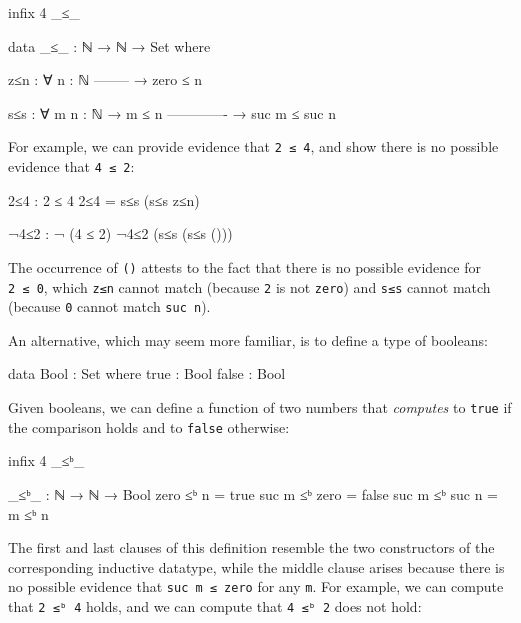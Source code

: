 \begin{fence}
\begin{code}
infix 4 _≤_

data _≤_ : ℕ → ℕ → Set where

  z≤n : ∀ {n : ℕ}
      --------
    → zero ≤ n

  s≤s : ∀ {m n : ℕ}
    → m ≤ n
      -------------
    → suc m ≤ suc n
\end{code}
\end{fence}

For example, we can provide evidence that \texttt{2\ ≤\ 4}, and show
there is no possible evidence that \texttt{4\ ≤\ 2}:

\begin{fence}
\begin{code}
2≤4 : 2 ≤ 4
2≤4 = s≤s (s≤s z≤n)

¬4≤2 : ¬ (4 ≤ 2)
¬4≤2 (s≤s (s≤s ()))
\end{code}
\end{fence}

The occurrence of \texttt{()} attests to the fact that there is no
possible evidence for \texttt{2\ ≤\ 0}, which \texttt{z≤n} cannot match
(because \texttt{2} is not \texttt{zero}) and \texttt{s≤s} cannot match
(because \texttt{0} cannot match \texttt{suc\ n}).

An alternative, which may seem more familiar, is to define a type of
booleans:

\begin{fence}
\begin{code}
data Bool : Set where
  true  : Bool
  false : Bool
\end{code}
\end{fence}

Given booleans, we can define a function of two numbers that
\emph{computes} to \texttt{true} if the comparison holds and to
\texttt{false} otherwise:

\begin{fence}
\begin{code}
infix 4 _≤ᵇ_

_≤ᵇ_ : ℕ → ℕ → Bool
zero ≤ᵇ n       =  true
suc m ≤ᵇ zero   =  false
suc m ≤ᵇ suc n  =  m ≤ᵇ n
\end{code}
\end{fence}

The first and last clauses of this definition resemble the two
constructors of the corresponding inductive datatype, while the middle
clause arises because there is no possible evidence that
\texttt{suc\ m\ ≤\ zero} for any \texttt{m}. For example, we can compute
that \texttt{2\ ≤ᵇ\ 4} holds, and we can compute that \texttt{4\ ≤ᵇ\ 2}
does not hold:

